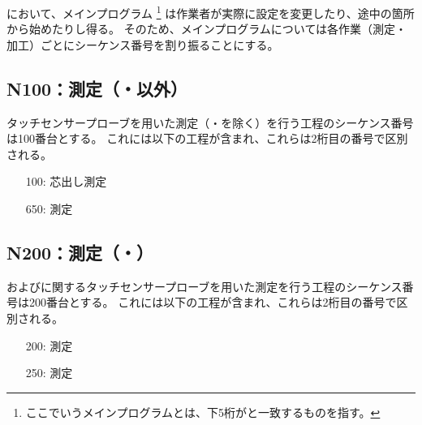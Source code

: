 \clearpage
\DMC において、メインプログラム
\footnote{ここでいうメインプログラムとは、下5桁が\DrawingNumber と一致するものを指す。}
は作業者が実際に設定を変更したり、途中の箇所から始めたりし得る。
そのため、メインプログラムについては各作業（測定・加工）ごとにシーケンス番号を割り振ることにする。


\subsection{N100：測定（\Dimple・\ReliefGroove 以外）}
タッチセンサープローブを用いた測定（\Dimple ・\ReliefGroove を除く）を行う工程のシーケンス番号は100番台とする。
これには以下の工程が含まれ、これらは2桁目の番号で区別される。
\begin{enumerate}
\item[100:] 芯出し測定
\item[650:] \nameCenterlineEndFaceDif 測定
\end{enumerate}


\subsection{N200：測定（\Dimple・\ReliefGroove）}
\Dimple および\ReliefGroove に関するタッチセンサープローブを用いた測定を行う工程のシーケンス番号は200番台とする。
これには以下の工程が含まれ、これらは2桁目の番号で区別される。
\begin{enumerate}
\item[200:] \Dimple 測定
\item[250:] \ReliefGroove 測定
\end{enumerate}


